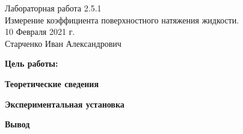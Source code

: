 




\setcounter{page}{1}



\begin{center}
  \LARGE{Лабораторная работа 2.5.1}\\[0.2cm]
  \LARGE{Измерение коэффициента поверхностного натяжения жидкости.}\\[0.2cm]
  \large{10 Февраля 2021 г.}\\[0.2cm]
  \large{Старченко Иван Александрович}\\[0.2cm]
\end{center}

\textbf{Цель работы:} \\
 


\begin{center}
	\large{\textbf{Теоретические сведения}}
\end{center}



\begin{center}
	\large{\textbf{Экспериментальная установка}}
\end{center}



\begin{center}
	\large{\textbf{Вывод}}
\end{center}




 













 




